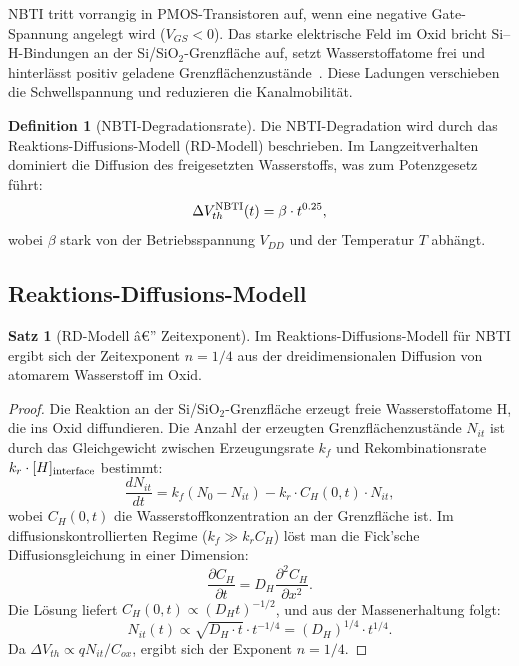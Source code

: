 ﻿\documentclass[a4paper,12pt]{article}
\theoremstyle{definition}
\newtheorem{definition}{Definition}
\newtheorem{satz}{Satz}
\begin{document}
NBTI tritt vorrangig in PMOS-Transistoren auf, wenn eine negative Gate-Spannung
angelegt wird ($V_{GS} < 0$). Das starke elektrische Feld im Oxid bricht
Si--H-Bindungen an der Si/SiO$_2$-Grenzfläche auf, setzt Wasserstoffatome frei
und hinterlässt positiv geladene Grenzflächenzustände~\cite{alam2005,stathis2006}.
Diese Ladungen verschieben die Schwellspannung und reduzieren die Kanalmobilität.

\begin{definition}[NBTI-Degradationsrate]
	Die NBTI-Degradation wird durch das Reaktions-Diffusions-Modell (RD-Modell)
	beschrieben. Im Langzeitverhalten dominiert die Diffusion des freigesetzten
	Wasserstoffs, was zum Potenzgesetz führt:
	\[
	\Delta V_{th}^{\rm NBTI}(t) = \beta \cdot t^{0.25},
	\]
	wobei $\beta$ stark von der Betriebsspannung $V_{DD}$ und der Temperatur $T$ abhängt.
\end{definition}

\subsection{Reaktions-Diffusions-Modell}

\begin{satz}[RD-Modell â€” Zeitexponent]
	\label{satz:nbti}
	Im Reaktions-Diffusions-Modell für NBTI ergibt sich der Zeitexponent $n = 1/4$
	aus der dreidimensionalen Diffusion von atomarem Wasserstoff im Oxid.
\end{satz}

\begin{proof}
	Die Reaktion an der Si/SiO$_2$-Grenzfläche erzeugt freie Wasserstoffatome H,
	die ins Oxid diffundieren. Die Anzahl der erzeugten Grenzflächenzustände
	$N_{it}$ ist durch das Gleichgewicht zwischen Erzeugungsrate $k_f$ und
	Rekombinationsrate $k_r \cdot [H]_{\rm interface}$ bestimmt:
	\[
	\frac{dN_{it}}{dt} = k_f (N_0 - N_{it}) - k_r \cdot C_H(0,t) \cdot N_{it},
	\]
	wobei $C_H(0,t)$ die Wasserstoffkonzentration an der Grenzfläche ist.
	Im diffusionskontrollierten Regime ($k_f \gg k_r C_H$) löst man die
	Fick'sche Diffusionsgleichung in einer Dimension:
	\[
	\frac{\partial C_H}{\partial t} = D_H \frac{\partial^2 C_H}{\partial x^2}.
	\]
	Die Lösung liefert $C_H(0,t) \propto (D_H t)^{-1/2}$, und aus der
	Massenerhaltung folgt:
	\[
	N_{it}(t) \propto \sqrt{D_H \cdot t} \cdot t^{-1/4} = (D_H)^{1/4} \cdot t^{1/4}.
	\]
	Da $\Delta V_{th} \propto q N_{it} / C_{ox}$, ergibt sich der Exponent $n = 1/4$.
	\qedhere
\end{proof}
\end{document}
